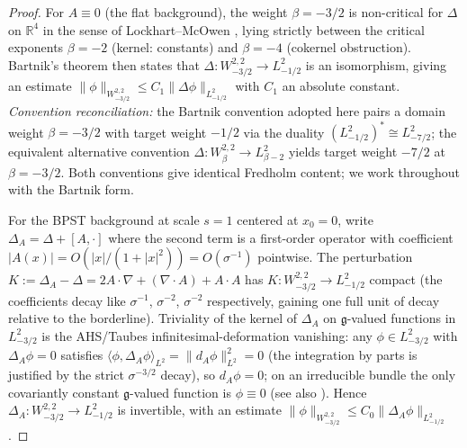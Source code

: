 \documentclass[11pt,letterpaper]{article}
\theoremstyle{definition}
\newcommand{\bbR}{\mathbb{R}}
\newcommand{\fg}{\mathfrak{g}}
\newcommand{\Lap}{\Delta}
\begin{document}
\begin{proof}
For $A \equiv 0$ (the flat background), the weight $\beta = -3/2$ is non-critical for $\Lap$ on $\bbR^4$ in the sense of Lockhart--McOwen \cite{LMcO1985}, lying strictly between the critical exponents $\beta = -2$ (kernel: constants) and $\beta = -4$ (cokernel obstruction). Bartnik's theorem \cite[Thm.~1.7]{Bartnik1986} then states that $\Lap: W^{2,2}_{-3/2} \to L^2_{-1/2}$ is an isomorphism, giving an estimate $\|\phi\|_{W^{2,2}_{-3/2}}\le C_1\|\Lap\phi\|_{L^2_{-1/2}}$ with $C_1$ an absolute constant. \emph{Convention reconciliation:} the Bartnik convention adopted here pairs a domain weight $\beta = -3/2$ with target weight $-1/2$ via the duality $(L^2_{-1/2})^* \cong L^2_{-7/2}$; the equivalent alternative convention $\Lap: W^{2,2}_\beta \to L^2_{\beta-2}$ yields target weight $-7/2$ at $\beta = -3/2$. Both conventions give identical Fredholm content; we work throughout with the Bartnik form.

For the BPST background at scale $s = 1$ centered at $x_0 = 0$, write $\Lap_A = \Lap + [A, \cdot]$ where the second term is a first-order operator with coefficient $|A(x)| = O(|x|/(1+|x|^2)) = O(\sigma^{-1})$ pointwise. The perturbation $K := \Lap_A - \Lap = 2A\cdot\nabla + (\nabla\cdot A) + A\cdot A$ has $K: W^{2,2}_{-3/2}\to L^2_{-1/2}$ compact (the coefficients decay like $\sigma^{-1}$, $\sigma^{-2}$, $\sigma^{-2}$ respectively, gaining one full unit of decay relative to the borderline). Triviality of the kernel of $\Lap_A$ on $\fg$-valued functions in $L^2_{-3/2}$ is the AHS/Taubes infinitesimal-deformation vanishing: any $\phi \in L^2_{-3/2}$ with $\Lap_A\phi = 0$ satisfies $\langle \phi, \Lap_A\phi\rangle_{L^2} = \|d_A\phi\|^2_{L^2} = 0$ (the integration by parts is justified by the strict $\sigma^{-3/2}$ decay), so $d_A\phi = 0$; on an irreducible bundle the only covariantly constant $\fg$-valued function is $\phi \equiv 0$ \cite[Prop.~3.4]{AHS1978} (see also \cite[Lem.~4.2.4]{DK1990}). Hence $\Lap_A: W^{2,2}_{-3/2}\to L^2_{-1/2}$ is invertible, with an estimate $\|\phi\|_{W^{2,2}_{-3/2}}\le C_0 \|\Lap_A \phi\|_{L^2_{-1/2}}$.


\end{proof}
\end{document}
